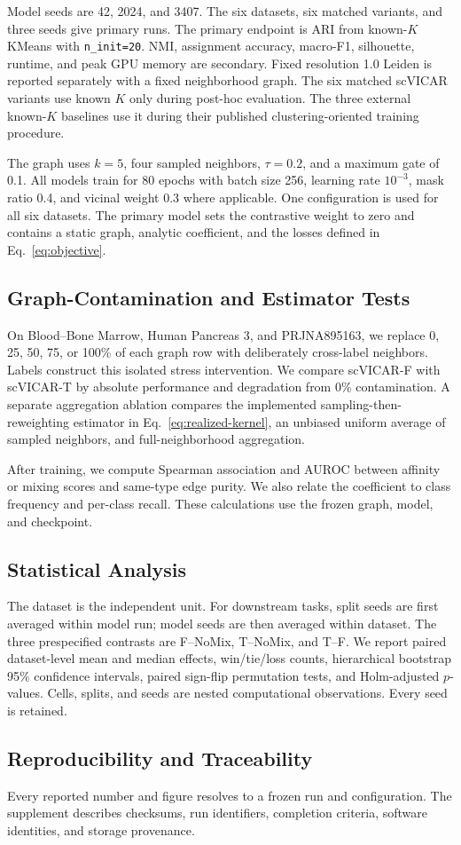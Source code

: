 Model seeds are 42, 2024, and 3407.  The six datasets, six matched variants,
and three seeds give \FormalRunCount{} primary runs.  The primary endpoint is
ARI from known-$K$ KMeans with \texttt{n\_init=20}.  NMI, assignment accuracy,
macro-F1, silhouette, runtime, and peak GPU memory are secondary.  Fixed
resolution 1.0 Leiden is reported separately with a fixed neighborhood graph.
The six matched scVICAR variants use known $K$ only during post-hoc evaluation.
The three external known-$K$ baselines use it during their published
clustering-oriented training procedure.

The graph uses $k=5$, four sampled neighbors, $\tau=0.2$, and a maximum gate of
0.1.  All models train for 80 epochs with batch size 256, learning rate
$10^{-3}$, mask ratio 0.4, and vicinal weight 0.3 where applicable. One
configuration is used for all six datasets. The primary model sets the
contrastive weight to zero and contains a static graph, analytic coefficient,
and the losses defined in Eq.~\eqref{eq:objective}.

\subsection{Graph-Contamination and Estimator Tests}

On Blood--Bone Marrow, Human Pancreas 3, and PRJNA895163, we replace 0, 25, 50,
75, or 100\% of each graph row with deliberately cross-label neighbors. Labels
construct this isolated stress intervention. We compare scVICAR-F with scVICAR-T by absolute performance
and degradation from 0\% contamination.  A separate aggregation ablation
compares the implemented sampling-then-reweighting estimator in
Eq.~\eqref{eq:realized-kernel}, an unbiased uniform average of sampled
neighbors, and full-neighborhood aggregation.

After training, we compute Spearman association and AUROC between affinity or
mixing scores and same-type edge purity. We also relate the coefficient to
class frequency and per-class recall. These calculations use the frozen graph,
model, and checkpoint.

\subsection{Statistical Analysis}

The dataset is the independent unit. For downstream tasks, split seeds are first
averaged within model run; model seeds are then averaged within dataset.  The
three prespecified contrasts are F--NoMix, T--NoMix, and T--F.  We report paired
dataset-level mean and median effects, win/tie/loss counts, hierarchical
bootstrap 95\% confidence intervals, paired sign-flip permutation tests, and
Holm-adjusted $p$-values. Cells, splits, and seeds are nested computational
observations. Every seed is retained.

\subsection{Reproducibility and Traceability}

Every reported number and figure resolves to a frozen run and configuration.
The supplement describes checksums, run identifiers, completion criteria,
software identities, and storage provenance.
